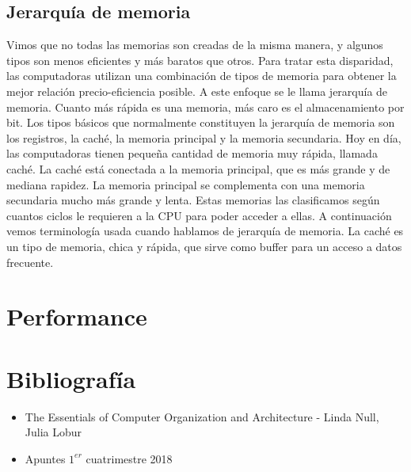 \documentclass[a4paper,12pt]{article}
\begin{document}
\subsection{Jerarquía de memoria}
Vimos que no todas las memorias son creadas de la misma manera, y algunos tipos son menos eficientes y más baratos que otros.
Para tratar esta disparidad, las computadoras utilizan una combinación de tipos de memoria para obtener la mejor relación
precio-eficiencia posible. A este enfoque se le llama jerarquía de memoria. Cuanto más rápida es una memoria, más caro es el
almacenamiento por bit. Los tipos básicos que normalmente constituyen la jerarquía de memoria son los registros, la caché, la
memoria principal y la memoria secundaria. Hoy en día, las computadoras tienen pequeña cantidad de memoria muy rápida, llamada
caché. La caché está conectada a la memoria principal, que es más grande y de mediana rapidez. La memoria principal se
complementa con una memoria secundaria mucho más grande y lenta. Estas memorias las clasificamos según cuantos ciclos le
requieren a la CPU para poder acceder a ellas. A continuación vemos terminología usada cuando hablamos de jerarquía de memoria.
La caché es un tipo de memoria, chica y rápida, que sirve como buffer para un acceso a datos frecuente.





\section{Performance}





\section{Bibliografía}
\begin{itemize}
  \item The Essentials of Computer Organization and Architecture - Linda Null, Julia Lobur
  \item Apuntes $1^{er}$ cuatrimestre 2018
\end{itemize}
\end{document}

